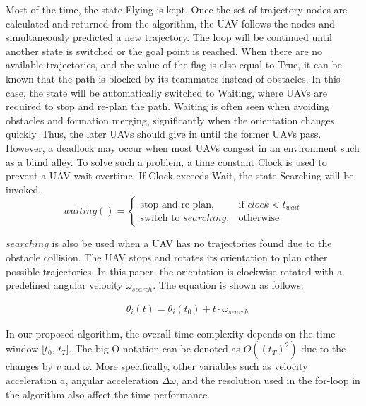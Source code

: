 
Most of the time, the state Flying is kept.
Once the set of trajectory nodes are calculated and returned from the algorithm, the UAV follows the nodes and simultaneously predicted a new trajectory. The loop will be continued until another state is switched or the goal point is reached. When there are no available trajectories, and the value of the flag is also equal to True, it can be known that the path is blocked by its teammates instead of obstacles. In this case, the state will be automatically switched to Waiting, where UAVs are required to stop and re-plan the path. Waiting is often seen when avoiding obstacles and formation merging, significantly when the orientation changes quickly. Thus, the later UAVs should give in until the former UAVs pass. However, a deadlock may occur when most UAVs congest in an environment such as a blind alley. To solve such a problem, a time constant Clock is used to prevent a UAV wait overtime. If Clock
exceeds Wait, the state Searching will be invoked.
\[
    waiting()= 
\begin{cases}
    \text{stop and re-plan},& \text{if } clock<t_{wait}\\
    \text{switch to } searching, & \text{otherwise}
\end{cases}
\]

$searching$ is also be used when a UAV has no trajectories found due to the obstacle collision. The UAV stops and rotates its orientation to plan other possible trajectories. In this paper, the orientation is clockwise rotated with a predefined angular velocity $\omega_{search}$. The equation is shown as follows:

\begin{equation}
\begin{aligned}
& \theta_{i}(t) = \theta_{i}(t_{0}) + t \cdot \omega_{search}
\end{aligned}
\end{equation}

In our proposed algorithm, the overall time complexity depends on the time window [$t_{0}$, $t_{T}$]. The big-O notation can be denoted as $O((t_{T})^2)$ due to the changes by $v$ and $\omega$. More specifically, other variables such as velocity acceleration $a$, angular acceleration $\Delta\omega$, and the resolution used in the for-loop in the algorithm also affect the time performance.




